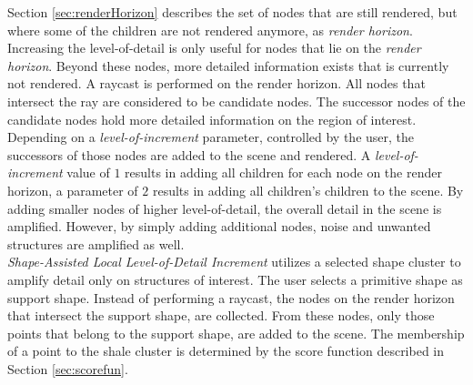 Section \ref{sec:renderHorizon} describes the set of nodes that are still rendered, but where some of the children are not rendered anymore, as \textit{render horizon}. 
Increasing the level-of-detail is only useful for nodes that lie on the \textit{render horizon}. Beyond these nodes, more detailed information exists that is currently not rendered. A raycast is performed on the render horizon. All nodes that intersect the ray are considered to be candidate nodes. The successor nodes of the candidate nodes hold more detailed information on the region of interest. Depending on a \textit{level-of-increment} parameter, controlled by the user, the successors of those nodes are added to the scene and rendered. A \textit{level-of-increment} value of $1$ results in adding all children for each node on the render horizon, a parameter of $2$ results in adding all children's children to the scene. 
By adding smaller nodes of higher level-of-detail, the overall detail in the scene is amplified. However, by simply adding additional nodes, noise and unwanted structures are amplified as well. 
\\

\textit{Shape-Assisted Local Level-of-Detail Increment} utilizes a selected shape cluster to amplify detail only on structures of interest. The user selects a primitive shape as support shape. Instead of performing a raycast, the nodes on the render horizon that intersect the support shape, are collected. From these nodes, only those points that belong to the support shape, are added to the scene. The membership of a point to the shale cluster is determined by the score function described in Section \ref{sec:scorefun}. 

